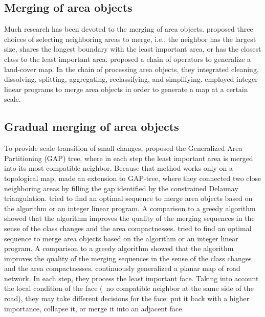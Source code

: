 \documentclass[twocolumn]{svjour3}          %
\begin{document}



\subsection{Merging of area objects}
Much research has been devoted to the merging of area objects.
\citet{Cheng2006} proposed three choices of 
selecting neighboring areas to merge, i.e.,
the neighbor has the largest size, 
shares the longest boundary with the least important area,
or has the closest class to the least important area.
\citet{Thiemann2018LandCover} proposed a chain of operators 
to generalize a land-cover map.
In the chain of processing area objects, 
they integrated cleaning, dissolving, splitting, 
aggregating, reclassifying, and simplifying.
\citet{HaunertWolff2010AreaAgg,Oehrlein2017Aggregation} 
employed integer linear programs to merge area objects
in order to generate a map at a certain scale.



\subsection{Gradual merging of area objects}
\label{sec:gradual_merge}

To provide scale transition of small changes, 
\citet{vanOosterom1995GAPTree} proposed 
the Generalized Area Partitioning (GAP) tree,
where in each step the least important area is merged into
its most compatible neighbor.
Because that method works only on a topological map,
\citet{Ai2002GAP} made an extension to GAP-tree,
where they connected two close neighboring areas 
by filling the gap identified by the constrained Delaunay triangulation.
\citet{Peng2020AreaAgg} tried to 
find an optimal sequence to merge area objects 
based on the \Astar algorithm or an integer linear program.
A comparison to a greedy algorithm showed that 
the \Astar algorithm improves the quality of the merging sequences
in the sense of the class changes and the area compactnesses.
\citet{Peng2020AreaAgg} tried to 
find an optimal sequence to merge area objects 
based on the \Astar algorithm or an integer linear program.
A comparison to a greedy algorithm showed that 
the \Astar algorithm improves the quality of the merging sequences
in the sense of the class changes and the area compactnesses.
\citet{Suba2016Road} continuously generalized a planar map of road network.
In each step, they process the least important face.
Taking into account the local condition of the face
(\eg~no compatible neighbor at the same side of the road),
they may take different decisions for the face: 
put it back with a higher importance, collapse it, 
or merge it into an adjacent face.
\end{document}
